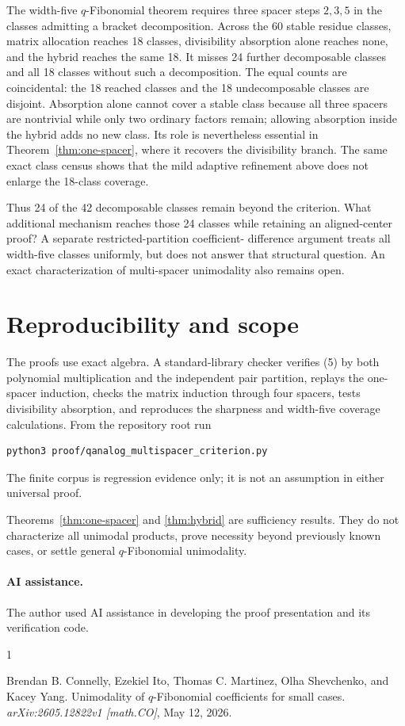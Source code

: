\documentclass[11pt]{article}
\begin{document}
The width-five \(q\)-Fibonomial theorem requires three spacer steps
\(2,3,5\) in the classes admitting a bracket decomposition.  Across the 60
stable residue classes, matrix allocation reaches 18 classes, divisibility
absorption alone reaches none, and the hybrid reaches the same 18.  It
misses 24 further decomposable classes and all 18 classes without such a
decomposition.  The equal counts are coincidental: the 18 reached classes
and the 18 undecomposable classes are disjoint.  Absorption alone cannot
cover a stable class because all three spacers are nontrivial while only two
ordinary factors remain; allowing absorption inside the hybrid adds no new
class.  Its role is nevertheless essential in
Theorem~\ref{thm:one-spacer}, where it recovers the divisibility branch.
The same exact class census shows that the mild adaptive refinement above
does not enlarge the 18-class coverage.

Thus 24 of the 42 decomposable classes remain beyond the criterion.  What
additional mechanism reaches those 24 classes while retaining an
aligned-center proof?  A separate restricted-partition coefficient-
difference argument treats all width-five classes uniformly, but does not
answer that structural question.  An exact characterization of
multi-spacer unimodality also remains open.

\section{Reproducibility and scope}

The proofs use exact algebra.  A standard-library checker verifies (5) by
both polynomial multiplication and the independent pair partition, replays
the one-spacer induction, checks the matrix induction through four spacers,
tests divisibility absorption, and reproduces the sharpness and width-five
coverage calculations.  From the repository root run
\begin{verbatim}
python3 proof/qanalog_multispacer_criterion.py
\end{verbatim}
The finite corpus is regression evidence only; it is not an assumption in
either universal proof.

Theorems~\ref{thm:one-spacer} and \ref{thm:hybrid} are sufficiency results.
They do not characterize all unimodal products, prove necessity beyond
previously known cases, or settle general \(q\)-Fibonomial unimodality.

\paragraph{AI assistance.}
The author used AI assistance in developing the proof presentation and its
verification code.

\begin{thebibliography}{1}

Brendan B. Connelly, Ezekiel Ito, Thomas C. Martinez, Olha Shevchenko, and
Kacey Yang.
\newblock Unimodality of \(q\)-Fibonomial coefficients for small cases.
\newblock \emph{arXiv:2605.12822v1 [math.CO]}, May 12, 2026.

\end{thebibliography}
\end{document}
